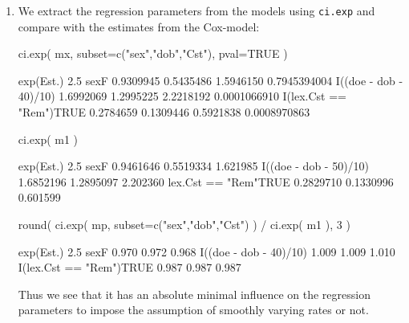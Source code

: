 \begin{enumerate}[resume]
\item We extract the regression parameters from the models using
  \texttt{ci.exp} and compare with the estimates from the Cox-model:
\begin{Schunk}
\begin{Sinput}
 ci.exp( mx, subset=c("sex","dob","Cst"), pval=TRUE )
\end{Sinput}
\begin{Soutput}
                        exp(Est.)      2.5%     97.5%            P
sexF                    0.9309945 0.5435486 1.5946150 0.7945394004
I((doe - dob - 40)/10)  1.6992069 1.2995225 2.2218192 0.0001066910
I(lex.Cst == "Rem")TRUE 0.2784659 0.1309446 0.5921838 0.0008970863
\end{Soutput}
\begin{Sinput}
 ci.exp( m1 )
\end{Sinput}
\begin{Soutput}
                       exp(Est.)      2.5%    97.5%
sexF                   0.9461646 0.5519334 1.621985
I((doe - dob - 50)/10) 1.6852196 1.2895097 2.202360
lex.Cst == "Rem"TRUE   0.2829710 0.1330996 0.601599
\end{Soutput}
\begin{Sinput}
 round( ci.exp( mp, subset=c("sex","dob","Cst") ) / ci.exp( m1 ), 3 )
\end{Sinput}
\begin{Soutput}
                        exp(Est.)  2.5% 97.5%
sexF                        0.970 0.972 0.968
I((doe - dob - 40)/10)      1.009 1.009 1.010
I(lex.Cst == "Rem")TRUE     0.987 0.987 0.987
\end{Soutput}
\end{Schunk}
Thus we see that it has an absolute minimal influence on the
regression parameters to impose the assumption of smoothly varying
rates or not.



\end{enumerate}
